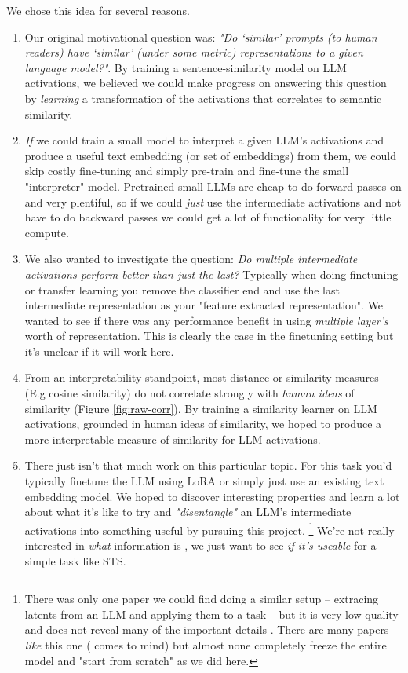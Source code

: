 \documentclass[14pt]{article}
\begin{document}
We chose this idea for several reasons.
\begin{enumerate}
    \item Our original motivational question was: \textit{"Do ‘similar’ prompts (to human readers) have ‘similar’ (under some metric) representations to a given language model?"}. By training a sentence-similarity model on LLM activations, we believed we could make progress on answering this question by \textit{learning} a transformation of the activations that correlates to semantic similarity.

    \item \textit{If} we could train a small model to interpret a given LLM's activations and produce a useful text embedding (or set of embeddings) from them, we could skip costly fine-tuning and simply pre-train and fine-tune the small "interpreter" model. Pretrained small LLMs are cheap to do forward passes on and very plentiful, so if we could \textit{just} use the intermediate activations and not have to do backward passes we could get a lot of functionality for very little compute.
    
    \item We also wanted to investigate the question: \textit{Do multiple intermediate activations perform better than just the last?} Typically when doing finetuning or transfer learning you remove the classifier end and use the last intermediate representation as your "feature extracted representation". We wanted to see if there was any performance benefit in using \textit{multiple layer's} worth of representation. This is clearly the case in the finetuning setting \cite{tang2024poolingattentioneffectivedesigns} but it's unclear if it will work here.
    
    \item From an interpretability standpoint, most distance or similarity measures (E.g cosine similarity) do not correlate strongly with \textit{human ideas} of similarity (Figure \ref{fig:raw-corr}). By training a similarity learner on LLM activations, grounded in human ideas of similarity, we hoped to produce a more interpretable measure of similarity for LLM activations.
    
    \item There just isn't that much work on this particular topic. For this task you'd typically finetune the LLM using LoRA \cite{hu2021loralowrankadaptationlarge} or simply just use an existing text embedding model. We hoped to discover interesting properties and learn a lot about what it's like to try and \textit{"disentangle"} an LLM's intermediate activations into something useful by pursuing this project. \footnote{There was only one paper we could find doing a similar setup -- extracing latents from an LLM and applying them to a task -- but it is very low quality and does not reveal many of the important details \cite{gpt2malware}. There are many papers \textit{like} this one (\cite{lu2021pretrainedtransformersuniversalcomputation} comes to mind) but almost none completely freeze the entire model and "start from scratch" as we did here.} We're not really interested in \textit{what} information is , we just want to see \textit{if it's useable} for a simple task like STS.
    

\end{enumerate}
\end{document}

